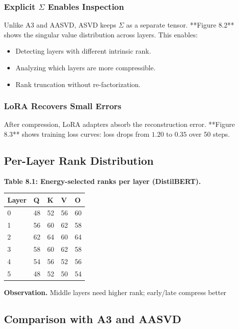 \subsubsection{Explicit $\Sigma$ Enables Inspection}

Unlike A3 and AASVD, ASVD keeps $\Sigma$ as a separate tensor. **Figure 
8.2** shows the singular value distribution across layers. This enables:

\begin{itemize}
\item Detecting layers with different intrinsic rank.
\item Analyzing which layers are more compressible.
\item Rank truncation without re-factorization.

\end{itemize}
\subsubsection{LoRA Recovers Small Errors}

After compression, LoRA adapters absorb the reconstruction error. **Figure 
8.3** shows training loss curves: loss drops from $1.20$ to 
$0.35$ over 50 steps.

\subsection{Per-Layer Rank Distribution}

\textbf{Table 8.1: Energy-selected ranks per layer (DistilBERT).}

\begin{table}[H]
\centering
\small
\begin{tabular}{lllll}
\toprule
\textbf{Layer} & \textbf{Q} & \textbf{K} & \textbf{V} & \textbf{O} \\
\midrule
0 & 48 & 52 & 56 & 60 \\
1 & 56 & 60 & 62 & 58 \\
2 & 62 & 64 & 60 & 64 \\
3 & 58 & 60 & 62 & 58 \\
4 & 54 & 56 & 52 & 56 \\
5 & 48 & 52 & 50 & 54 \\
\bottomrule
\end{tabular}
\end{table}

\textbf{Observation.} Middle layers need higher rank; early/late compress better

\subsection{Comparison with A3 and AASVD}

